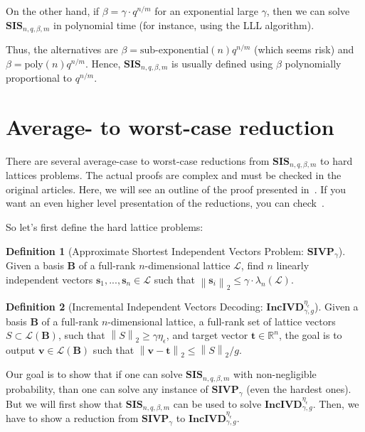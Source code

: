 \documentclass[a4paper,11pt]{article}
\let\vec\mathbf %
\newcommand\R{{\mathbb R}}
\newcommand\Znm{{\mathbb Z}^{n\times m}}
\newcommand\LB{\mathcal{L}\left(\vec B\right)}
\newcommand\smooth{\eta_\epsilon}
\newcommand\SIS{\textbf{SIS}_{n, q, \beta, m}}
\newcommand\gapSVP{\textbf{gapSVP}_\gamma}
\newcommand\SIVP{\textbf{SIVP}_\gamma}
\newcommand\incIVD{\textbf{IncIVD}_{\gamma, g}^{\smooth}}
\newcommand{\norm}[1]{\left\lVert #1 \right\rVert_2}
\theoremstyle{definition}
\newtheorem{definition}{Definition}[section]
\theoremstyle{remark}
\begin{document}
On the other hand, if $\beta = \gamma \cdot q^{n/m}$ for an exponential large
$\gamma$, then we can solve $\SIS$ in polynomial time (for instance, using the
LLL algorithm).

Thus, the alternatives are $\beta = \text{sub-exponential}(n)q^{n/m}$ (which
seems risk) and $\beta = \text{poly}(n) q^{n/m}$. Hence, $\SIS$ is usually
defined using $\beta$ polynomially proportional to $q^{n/m}$.

\section{Average- to worst-case reduction}

There are several average-case to worst-case reductions from $\SIS$ to hard
lattices problems. The actual proofs are complex and must be checked in
the original articles. Here, we will see an outline of the proof presented 
in~\cite{gpv07}. If you want an even higher level presentation of the 
reductions, you can check~\cite{peikert16}.

So let's first define the hard lattice problems:
%


\begin{definition}[Approximate Shortest Independent Vectors Problem: $\SIVP$]
Given a basis $\vec B$ of a full-rank $n$-dimensional lattice $\mathcal{L}$,
find $n$ linearly independent vectors $\vec s_1, ..., \vec s_n \in \mathcal{L}$
such that $\norm{\vec s_i} \le \gamma\cdot\lambda_n(\mathcal{L})$.
\end{definition}


\begin{definition}[Incremental Independent Vectors Decoding: $\incIVD$]
Given a basis $\vec B$ of a full-rank $n$-dimensional lattice, a full-rank set 
of lattice vectors $S \subset \LB$, such that $\norm{S} \ge \gamma\smooth$, 
and target vector $\vec t \in \R^n$, the goal is to output $\vec v \in \LB$ such
that $\norm{\vec v - \vec t} \le \norm{S} / g$.
\end{definition}

Our goal is to show that if one can solve $\SIS$ with non-negligible 
probability, than one can solve any instance of $\SIVP$ (even the hardest 
ones). But we will first show that $\SIS$ can be used to solve $\incIVD$. Then, 
we have to show a reduction from $\SIVP$ to $\incIVD$.
\end{document}
